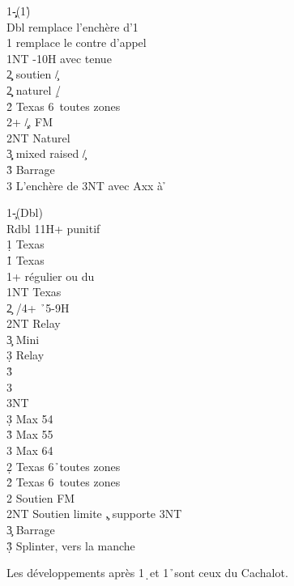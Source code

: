 \documentclass[a4paper]{article}
\begin{document}
\begin{bidtable}
1\c\d-(1\h)\\
Dbl \> remplace l'enchère d'1\s \\
1\s \> remplace le contre d'appel\\
1NT -10H avec tenue\\
2\c\d \> soutien \c /\d \\
2\d\c \> naturel \d /\c \\
2\h \> Texas 6\s\ toutes zones\\
2\s {}+ \c /\d , FM\\
2NT \> Naturel\\
3\c\d \> mixed raised \c /\d \\
3\h \> Barrage \s \\
3\s \> L'enchère de 3NT avec Axx à \h 
\end{bidtable}

\begin{bidtable}
1\c-(Dbl)\\
Rdbl \> 11H+ punitif\\
1\d \> Texas \h \\
1\h \> Texas \s \\
1\s {}+ régulier ou du \d \\
1NT \> Texas \c \\
2\c {} \s /4+ \h\ 5-9H\+\\
2NT \> Relay\+\\
3\c \> Mini\+\\
3\d \> Relay\+\\
3\h {}\\
3\s {}\\
3NT \-\-\\
3\d \> Max 54\\
3\h \> Max 55\\
3\s \> Max 64\-\-\\
2\d \> Texas 6\h\ toutes zones\\
2\h \> Texas 6\s\ toutes zones\\
2\s \> Soutien FM \c \\
2NT \> Soutien limite \c , supporte 3NT\\
3\c \> Barrage \c \\
3\d\h\s \> Splinter, vers la manche
\end{bidtable}

Les développements après 1\d\ et 1\h\ sont ceux du Cachalot.
\end{document}
